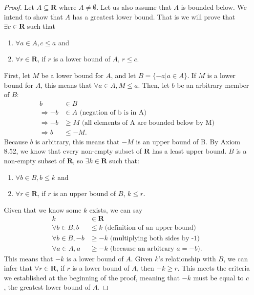\documentclass[12pt,oneside]{amsart}
\theoremstyle{remark}
\newcommand{\bfR}{\mathbf{R}}
\begin{document}
\begin{proof}
Let $A \subseteq \bfR$ where $A \neq \emptyset$. Let us also assume that $A$ is bounded below. We intend to show that $A$ has a greatest lower bound. That is we will prove that $\exists c \in \bfR$ such that
\begin{enumerate}
  \item $\forall a \in A, c \leq a$ and
  \item $\forall r \in \bfR$, if $r$ is a lower bound of $A$, $r \leq c$.
\end{enumerate}
First, let $M$ be a lower bound for $A$, and let $B = \{-a | a \in A\}$. If $M$ is a lower bound for $A$, this means that $\forall a \in A, M \leq a$. Then, let $b$ be an arbitrary member of $B$:
\begin{equation}
\begin{split}
             b &\in B \\
\Rightarrow -b &\in A \text{ (negation of b is in A)} \\
\Rightarrow -b &\geq M \text{ (all elements of A are bounded below by M)} \\
\Rightarrow b &\leq -M.
\end{split}
\end{equation}
Because $b$ is arbitrary, this means that $-M$ is an upper bound of B. By Axiom 8.52, we know that every non-empty subset of $\bfR$ has a least upper bound. $B$ is a non-empty subset of $\bfR$, so $\exists k \in \bfR$ such that:
\begin{enumerate}
  \item $\forall b \in B, b \leq k$ and
  \item $\forall r \in \bfR$, if $r$ is an upper bound of $B$, $k \leq r$.
\end{enumerate}
Given that we know some $k$ exists, we can say
\begin{equation}
\begin{split}
k &\in \bfR \\
\forall b \in B, b &\leq k \text{ (definition of an upper bound)} \\
\forall b \in B, -b &\geq -k \text{ (multiplying both sides by -1)} \\
\forall a \in A, a &\geq -k \text{ (because an arbitrary $a = -b$)}.
\end{split}
\end{equation}
This means that $-k$ is a lower bound of $A$. Given $k$'s relationship with $B$, we can infer that $\forall r \in \bfR$, if $r$ is a lower bound of $A$, then $-k \geq r$. This meets the criteria we established at the beginning of the proof, meaning that $-k$ must be equal to $c$, the greatest lower bound of $A$.
\end{proof}
\end{document}

